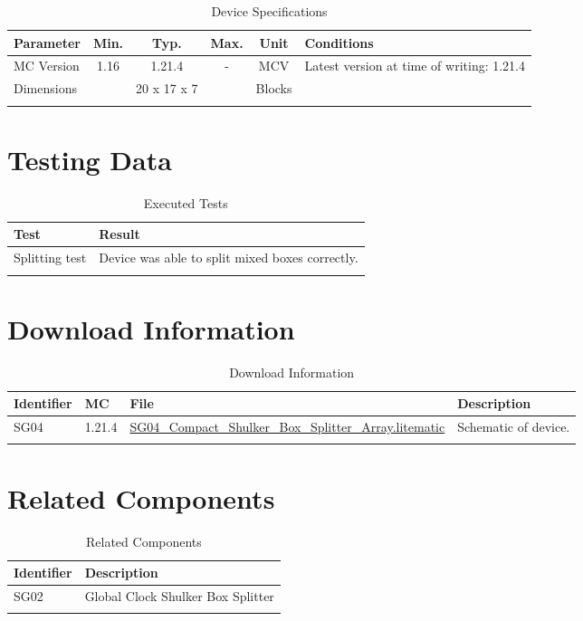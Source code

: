\documentclass[10pt]{datasheet}
\begin{document}
\begin{table}[H]
    \caption{Device Specifications}
    \begin{tabularx}{\textwidth}{l | c c c | c | X}
        \thickhline
        \textbf{Parameter} & \textbf{Min.} & \textbf{Typ.} & \textbf{Max.} &
        \textbf{Unit} & \textbf{Conditions} \\
        \hline
        MC Version & 1.16 & 1.21.4 & - & MCV & Latest version at time of writing: 1.21.4\\
        \hline
        Dimensions & & 20 x 17 x 7 & & Blocks & \\
        \thickhline
\end{tabularx}
\end{table}

\section{Testing Data}
\begin{table}[H]
    \caption{Executed Tests}
    \begin{tabularx}{\textwidth}{l | X}
        \thickhline
        \textbf{Test} & \textbf{Result} \\
        \hline
        Splitting test & Device was able to split mixed boxes correctly. \\
        \thickhline
\end{tabularx}
\end{table}
\section{Download Information}
\begin{table}[H]
    \caption{Download Information}
    \begin{tabularx}{\textwidth}{l | l | l | X}
        \thickhline
        \textbf{Identifier} & \textbf{MC} & \textbf{File} & \textbf{Description} \\
        \hline
        SG04 & 1.21.4 & \href{https://github.com/Soontech-Annals/Archive/blob/2b73adfd252c5e2cf9d202454dbef78a586bc482/Archive/splitting/SG04\%20Compact\%20Shulker\%20Box\%20Splitter\%20Array/SG04\_Compact\_Shulker\_Box\_Splitter\_Array.litematic?raw=1}{SG04\_Compact\_Shulker\_Box\_Splitter\_Array.litematic} & Schematic of device. \\
        \hline
        \thickhline
    \end{tabularx}
\end{table}


\section{Related Components}
\begin{table}[H]
    \caption{Related Components}
    \begin{tabularx}{\textwidth}{ l | l }
        \thickhline
        \textbf{Identifier} & \textbf{Description} \\
        \hline
        SG02 & Global Clock Shulker Box Splitter \\
        \thickhline
    \end{tabularx}
\end{table}
\end{document}

